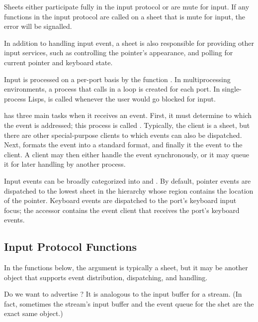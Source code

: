 Sheets either participate fully in the input protocol or are mute for input.  If
any functions in the input protocol are called on a sheet that is mute for
input, the  error will be signalled.

In addition to handling input event, a sheet is also responsible for providing
other input services, such as controlling the pointer's appearance, and polling
for current pointer and keyboard state.

Input is processed on a per-port basis by the function .
In multiprocessing environments, a process that calls  in a
loop is created for each port.  In single-process Lisps, 
is called whenever the user would go blocked for input.

 has three main tasks when it receives an event.  First,
it must determine to which  the event is addressed; this process
is called .  Typically, the client is a sheet, but there
are other special-purpose clients to which events can also be dispatched.  Next,
 formats the event into a standard format, and finally it
 the event to the client.  A client may then either handle
the event synchronously, or it may queue it for later handling by another
process.

Input events can be broadly categorized into  and
.  By default, pointer events are dispatched to the
lowest sheet in the hierarchy whose region contains the location of the pointer.
Keyboard events are dispatched to the port's keyboard input focus; the accessor
 contains the event client that receives the
port's keyboard events.


\subsection {Input Protocol Functions}

In the functions below, the  argument is typically a sheet, but it
may be another object that supports event distribution, dispatching, and
handling.

 {Do we want to advertise ?  It is analogous
to the input buffer for a stream.  (In fact, sometimes the stream's input buffer
and the event queue for the shet are the exact same object.)}

